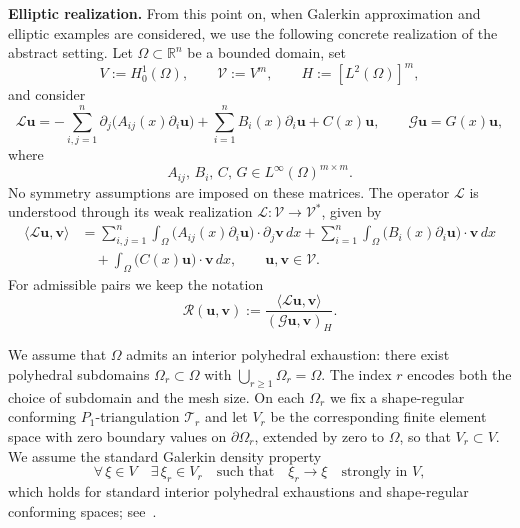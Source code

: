 \documentclass[preprint,10pt]{elsarticle}
\theoremstyle{plain}
\theoremstyle{definition}
\theoremstyle{remark}
\begin{document}
\medskip

\noindent\textbf{Elliptic realization.}\;
From this point on, when Galerkin approximation and elliptic examples are
considered, we use the following concrete realization of the abstract setting.
Let \(\Omega\subset\mathbb R^n\) be a bounded domain, set
\[
V:=H_0^1(\Omega),
\qquad
\mathcal V:=V^m,
\qquad
H:=[L^2(\Omega)]^m,
\]
and consider
\begin{equation}\label{eq:L_system}
	\mathcal L\mathbf u
	=
	-\sum_{i,j=1}^n \partial_j\!\bigl(A_{ij}(x)\partial_i\mathbf u\bigr)
	+
	\sum_{i=1}^n B_i(x)\partial_i\mathbf u
	+
	C(x)\mathbf u,
	\qquad
	\mathcal G\mathbf u=G(x)\mathbf u ,
\end{equation}
where
\[
A_{ij},\,B_i,\,C,\,G\in L^\infty(\Omega)^{m\times m}.
\]
No symmetry assumptions are imposed on these matrices. The operator
\(\mathcal L\) is understood through its weak realization
\(\mathcal L:\mathcal V\to\mathcal V^*\), given by
\[
\begin{aligned}
	\langle \mathcal L\mathbf u,\mathbf v\rangle
	&=
	\sum_{i,j=1}^n
	\int_\Omega
	\bigl(A_{ij}(x)\partial_i\mathbf u\bigr)\cdot
	\partial_j\mathbf v\,dx
	+
	\sum_{i=1}^n
	\int_\Omega
	\bigl(B_i(x)\partial_i\mathbf u\bigr)\cdot
	\mathbf v\,dx                                      \\
	&\quad
	+
	\int_\Omega
	\bigl(C(x)\mathbf u\bigr)\cdot \mathbf v\,dx,
	\qquad \mathbf u,\mathbf v\in\mathcal V .
\end{aligned}
\]
For admissible pairs we keep the notation
\begin{equation}\label{eq:Rel}
	\mathcal R(\mathbf u,\mathbf v)
	:=
	\frac{\langle \mathcal L\mathbf u,\mathbf v\rangle}
	{(\mathcal G\mathbf u,\mathbf v)_H}.
\end{equation}

We assume that $\Omega$ admits an interior polyhedral exhaustion: there exist
polyhedral subdomains $\Omega_r\subset\Omega$ with $\bigcup_{r\ge1}\Omega_r=\Omega$.
The index $r$ encodes both the choice of subdomain and the mesh size. On each
$\Omega_r$ we fix a shape-regular conforming $P_1$-triangulation $\mathcal{T}_r$
and let $V_r$ be the corresponding finite element space with zero boundary values
on $\partial\Omega_r$, extended by zero to $\Omega$, so that $V_r\subset V$. We
assume the standard Galerkin density property
\begin{equation}\label{eq:Wr-density}
	\forall\,\xi\in V \quad \exists\,\xi_r\in V_r \quad\text{such that}\quad
	\xi_r\longrightarrow\xi \quad\text{strongly in }V,
\end{equation}
which holds for standard interior polyhedral exhaustions and shape-regular
conforming spaces; see~\cite{ciaretRav,ciaret,Ern}.
\end{document}
